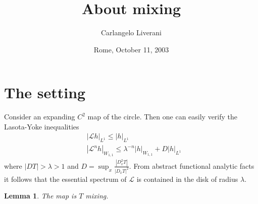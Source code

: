 \documentclass{amsart}
\numberwithin{equation}{section}
\newtheorem{lem}[thm]{Lemma}
\newcommand\Lp{{\mathcal L}}
\begin{document}
\title{\bfseries About mixing}
\author{Carlangelo Liverani}
\address{Dipartimento di Matematica\\
Universit\`{a} di Roma (Tor Vergata)\\
Via della Ricerca Scientifica, 00133 Roma, Italy\\
{\tt liverani@mat.uniroma2.it}}
\date{Rome, October 11, 2003}
\maketitle


\section{The setting}\label{sec:zero}

Consider an expanding $C^2$ map of the circle. Then one can easily
verify the Lasota-Yoke inequalities
\[
\begin{split}
&|\Lp h|_{L^1}\leq |h|_{L^1}\\
&|\Lp^nh|_{W_{1,1}}\leq \lambda^{-n}|h|_{W_{1,1}}+ D|h|_{L^1}
\end{split}
\]
where $|DT|>\lambda>1$ and $D=\sup_x\frac{|D^2_xT|}{|D_xT|^2}$.
From abstract functional analytic facts it follows that the essential
spectrum of $\Lp$ is contained in the disk of radius $\lambda$. 
\begin{lem}
The map is $T$ mixing.
\end{lem}
\end{document}
